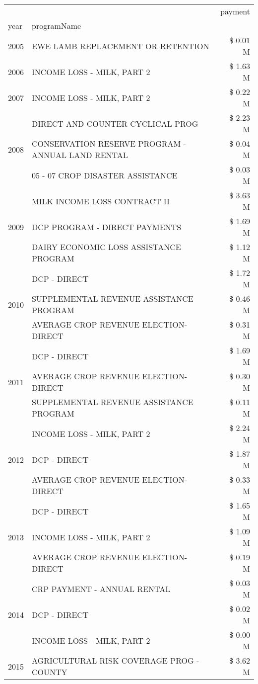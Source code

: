 \begin{tabular}{llr}
\toprule
 &  & payment \\
year & programName &  \\
\midrule
2005 & EWE LAMB REPLACEMENT OR RETENTION & \$ 0.01 M \\
\cline{1-3}
2006 & INCOME LOSS - MILK, PART 2 & \$ 1.63 M \\
\cline{1-3}
2007 & INCOME LOSS - MILK, PART 2 & \$ 0.22 M \\
\cline{1-3}
\multirow[t]{3}{*}{2008} & DIRECT AND COUNTER CYCLICAL PROG & \$ 2.23 M \\
 & CONSERVATION RESERVE PROGRAM - ANNUAL LAND RENTAL & \$ 0.04 M \\
 & 05 - 07 CROP DISASTER ASSISTANCE & \$ 0.03 M \\
\cline{1-3}
\multirow[t]{3}{*}{2009} & MILK INCOME LOSS CONTRACT II & \$ 3.63 M \\
 & DCP PROGRAM - DIRECT PAYMENTS & \$ 1.69 M \\
 & DAIRY ECONOMIC LOSS ASSISTANCE PROGRAM & \$ 1.12 M \\
\cline{1-3}
\multirow[t]{3}{*}{2010} & DCP - DIRECT & \$ 1.72 M \\
 & SUPPLEMENTAL REVENUE ASSISTANCE PROGRAM & \$ 0.46 M \\
 & AVERAGE CROP REVENUE ELECTION-DIRECT & \$ 0.31 M \\
\cline{1-3}
\multirow[t]{3}{*}{2011} & DCP - DIRECT & \$ 1.69 M \\
 & AVERAGE CROP REVENUE ELECTION-DIRECT & \$ 0.30 M \\
 & SUPPLEMENTAL REVENUE ASSISTANCE PROGRAM & \$ 0.11 M \\
\cline{1-3}
\multirow[t]{3}{*}{2012} & INCOME LOSS - MILK, PART 2 & \$ 2.24 M \\
 & DCP - DIRECT & \$ 1.87 M \\
 & AVERAGE CROP REVENUE ELECTION-DIRECT & \$ 0.33 M \\
\cline{1-3}
\multirow[t]{3}{*}{2013} & DCP - DIRECT & \$ 1.65 M \\
 & INCOME LOSS - MILK, PART 2 & \$ 1.09 M \\
 & AVERAGE CROP REVENUE ELECTION-DIRECT & \$ 0.19 M \\
\cline{1-3}
\multirow[t]{3}{*}{2014} & CRP PAYMENT - ANNUAL RENTAL & \$ 0.03 M \\
 & DCP - DIRECT & \$ 0.02 M \\
 & INCOME LOSS - MILK, PART 2 & \$ 0.00 M \\
\cline{1-3}
\multirow[t]{3}{*}{2015} & AGRICULTURAL RISK COVERAGE PROG - COUNTY & \$ 3.62 M \\

\end{tabular}
